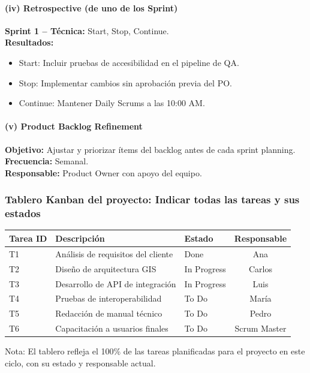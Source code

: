 \paragraph{(iv) Retrospective (de uno de los Sprint)}
\textbf{Sprint 1 – Técnica:} Start, Stop, Continue. \\
\textbf{Resultados:}
\begin{itemize}
  \item Start: Incluir pruebas de accesibilidad en el pipeline de QA.
  \item Stop: Implementar cambios sin aprobación previa del PO.
  \item Continue: Mantener Daily Scrums a las 10:00 AM.
\end{itemize}

\paragraph{(v) Product Backlog Refinement}
\textbf{Objetivo:} Ajustar y priorizar ítems del backlog antes de cada sprint planning. \\
\textbf{Frecuencia:} Semanal. \\
\textbf{Responsable:} Product Owner con apoyo del equipo.

\subsubsection{Tablero Kanban del proyecto: Indicar todas las tareas y sus estados}
\begin{center}
\begin{tabular}{lllc}
\hline
\textbf{Tarea ID} & \textbf{Descripción} & \textbf{Estado} & \textbf{Responsable} \\
\hline
T1 & Análisis de requisitos del cliente & Done & Ana \\
T2 & Diseño de arquitectura GIS & In Progress & Carlos \\
T3 & Desarrollo de API de integración & In Progress & Luis \\
T4 & Pruebas de interoperabilidad & To Do & María \\
T5 & Redacción de manual técnico & To Do & Pedro \\
T6 & Capacitación a usuarios finales & To Do & Scrum Master \\
\hline
\end{tabular}
\end{center}
\noindent Nota: El tablero refleja el 100\% de las tareas planificadas para el proyecto en este ciclo, con su estado y responsable actual.

